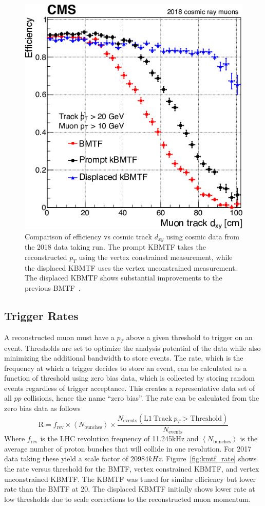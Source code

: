 \begin{figure}[htbp!]
	\centering
	\includegraphics[width=0.5\linewidth]{figs/04_muons/effVsDxy_kmtf.png}
	\caption[Comparison of efficiency vs cosmic track $d_{xy}$ using cosmic data from the 2018 data taking run. The prompt KBMTF takes the reconstructed $p_{T}$ using the vertex constrained measurement, while the displaced KBMTF uses the vertex unconstrained measurement. The displaced KBMTF shows substantial improvements to the previous BMTF.]
	{Comparison of efficiency vs cosmic track $d_{xy}$ using cosmic data from the 2018 data taking run. The prompt KBMTF takes the reconstructed $p_{T}$ using the vertex constrained measurement, while the displaced KBMTF uses the vertex unconstrained measurement. The displaced KBMTF shows substantial improvements to the previous BMTF~\cite{Hayrapetyan:2870088}.}
	\label{fig:effVsDxy_kmtf}
\end{figure}

\subsection{Trigger Rates} \label{sec:kmtf_rate}
A reconstructed muon must have a $p_T$ above a given threshold to trigger on an event. Thresholds are set to optimize the analysis potential of the data while also minimizing the additional bandwidth to store events. The rate, which is the frequency at which a trigger decides to store an event, can be calculated as a function of threshold using zero bias data, which is collected by storing random events regardless of trigger acceptance. This creates a representative data set of all $pp$ collisions, hence the name ``zero bias''. The rate can be calculated from the zero bias data as follows
\begin{equation}
	\mathrm{R} = f_\mathrm{rev}\times \left<N_\mathrm{bunches}\right>\times\frac{N_\mathrm{events}(\mathrm{L1}\ \mathrm{Track}\ p_{T}>\mathrm{Threshold})}{N_\mathrm{events}}
\end{equation}
Where $f_\mathrm{rev}$ is the LHC revolution frequency of 11.245\unit{kHz} and $\left<N_\mathrm{bunches}\right>$ is the average number of proton bunches that will collide in one revolution. For 2017 data taking these yield a scale factor of 20984$\unit{kHz}$. Figure~\ref{fig:kmtf_rate} shows the rate versus threshold for the BMTF, vertex constrained KBMTF, and vertex unconstrained KBMTF. The KBMTF was tuned for similar efficiency but lower rate than the BMTF at 20\GeV. The displaced KBMTF initially shows lower rate at low \pt thresholds due to scale corrections to the reconstructed muon momentum.

